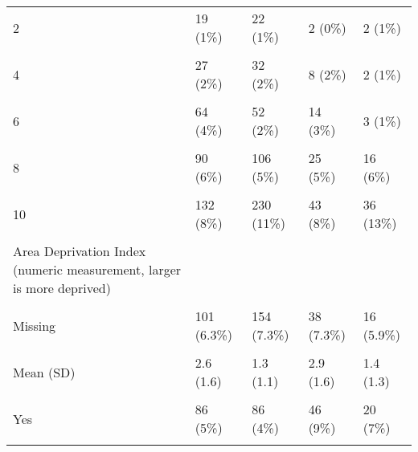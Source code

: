 \documentclass[
]{article}
\begin{document}
\begin{table}
\begin{tabular}[t]{lllll}
2 & 19 (1\%) & 22 (1\%) & 2 (0\%) & 2 (1\%)\\
\cellcolor{gray!10}{3} & \cellcolor{gray!10}{13 (1\%)} & \cellcolor{gray!10}{18 (1\%)} & \cellcolor{gray!10}{10 (2\%)} & \cellcolor{gray!10}{1 (0\%)}\\
4 & 27 (2\%) & 32 (2\%) & 8 (2\%) & 2 (1\%)\\
\cellcolor{gray!10}{5} & \cellcolor{gray!10}{31 (2\%)} & \cellcolor{gray!10}{35 (2\%)} & \cellcolor{gray!10}{7 (1\%)} & \cellcolor{gray!10}{9 (3\%)}\\
6 & 64 (4\%) & 52 (2\%) & 14 (3\%) & 3 (1\%)\\
\addlinespace
\cellcolor{gray!10}{7} & \cellcolor{gray!10}{73 (5\%)} & \cellcolor{gray!10}{79 (4\%)} & \cellcolor{gray!10}{31 (6\%)} & \cellcolor{gray!10}{13 (5\%)}\\
8 & 90 (6\%) & 106 (5\%) & 25 (5\%) & 16 (6\%)\\
\cellcolor{gray!10}{9} & \cellcolor{gray!10}{304 (19\%)} & \cellcolor{gray!10}{488 (23\%)} & \cellcolor{gray!10}{95 (18\%)} & \cellcolor{gray!10}{57 (21\%)}\\
10 & 132 (8\%) & 230 (11\%) & 43 (8\%) & 36 (13\%)\\
\cellcolor{gray!10}{Missing} & \cellcolor{gray!10}{824 (51.5\%)} & \cellcolor{gray!10}{1016 (47.9\%)} & \cellcolor{gray!10}{280 (53.7\%)} & \cellcolor{gray!10}{130 (48.0\%)}\\
\addlinespace
Area Deprivation Index (numeric measurement, larger is more deprived) &  &  &  & \\
\cellcolor{gray!10}{Mean (SD)} & \cellcolor{gray!10}{41 (27)} & \cellcolor{gray!10}{37 (26)} & \cellcolor{gray!10}{40 (27)} & \cellcolor{gray!10}{37 (27)}\\
Missing & 101 (6.3\%) & 154 (7.3\%) & 38 (7.3\%) & 16 (5.9\%)\\
\cellcolor{gray!10}{Family Conflict (numeric measurement, larger is more conflict)} & \cellcolor{gray!10}{} & \cellcolor{gray!10}{} & \cellcolor{gray!10}{} & \cellcolor{gray!10}{}\\
Mean (SD) & 2.6 (1.6) & 1.3 (1.1) & 2.9 (1.6) & 1.4 (1.3)\\
\addlinespace
\cellcolor{gray!10}{Previous Suicide Attempt in Family} & \cellcolor{gray!10}{} & \cellcolor{gray!10}{} & \cellcolor{gray!10}{} & \cellcolor{gray!10}{}\\
Yes & 86 (5\%) & 86 (4\%) & 46 (9\%) & 20 (7\%)\\
\cellcolor{gray!10}{No} & \cellcolor{gray!10}{1421 (89\%)} & \cellcolor{gray!10}{1937 (91\%)} & \cellcolor{gray!10}{443 (85\%)} & \cellcolor{gray!10}{234 (86\%)}\\

\end{tabular}
\end{table}
\end{document}
